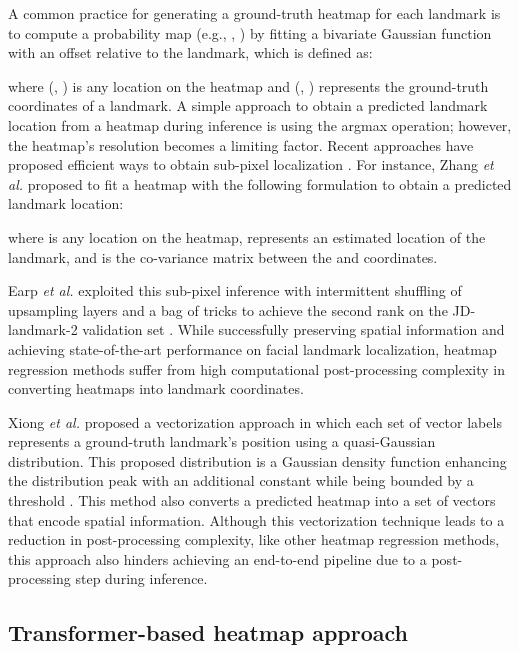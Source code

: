 \documentclass[journal]{IEEEtran}
\begin{document}
A common practice for generating a ground-truth heatmap for each landmark is to compute a probability map (e.g., \cite{Newell2016}, \cite{Wei2016}) by fitting a bivariate Gaussian function with an offset relative to the landmark, which is defined as:

where (, ) is any location on the heatmap and (, ) represents the ground-truth coordinates of a landmark. 
A simple approach to obtain a predicted landmark location from a heatmap during inference is using the argmax operation; however, the heatmap's resolution becomes a limiting factor. 
Recent approaches have proposed efficient ways to obtain sub-pixel localization \cite{Xiao2018SimpleBF, zhang2019distributionaware}.
For instance, Zhang \textit{et al.} \cite{zhang2019distributionaware} proposed to fit a heatmap with the following formulation to obtain a predicted landmark location:

where  is any location on the heatmap,  represents an estimated location of the landmark, and  is the co-variance matrix between the  and  coordinates.

Earp \textit{et al.} \cite{earp2021sub} exploited this sub-pixel inference with intermittent shuffling of upsampling layers and a bag of tricks to achieve the second rank on the JD-landmark-2 validation set \cite{liu2019}.
While successfully preserving spatial information and achieving state-of-the-art performance on facial landmark localization, heatmap regression methods suffer from high computational post-processing complexity in converting heatmaps into landmark coordinates.

Xiong \textit{et al.} \cite{xiong2020} proposed a vectorization approach in which each set of vector labels represents a ground-truth landmark's position using a quasi-Gaussian distribution.
This proposed distribution is a Gaussian density function enhancing the distribution peak with an additional constant  while being bounded by a threshold . 
This method also converts a predicted heatmap into a set of vectors that encode spatial information.
Although this vectorization technique leads to a reduction in post-processing complexity, like other heatmap regression methods, this approach also hinders achieving an end-to-end pipeline due to a post-processing step during inference.

\subsection{Transformer-based heatmap approach}\label{subsec:transformer_heatmap}
\end{document}
